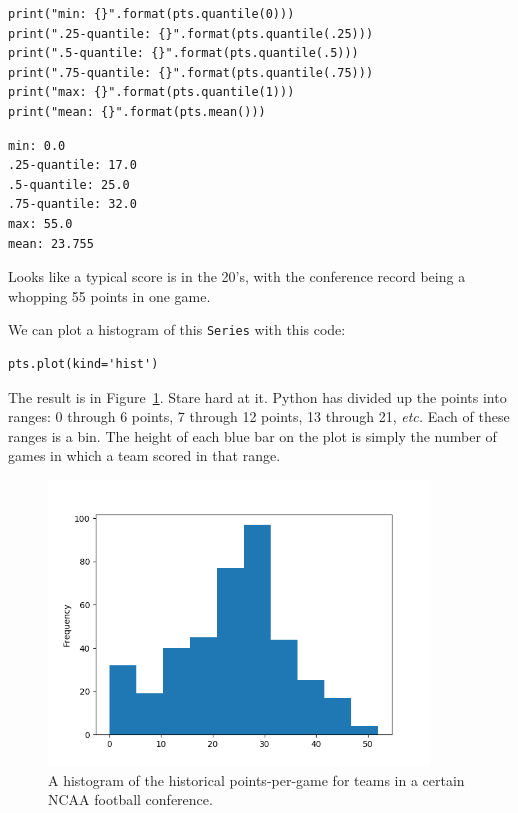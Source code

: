 \begin{Verbatim}[fontsize=\small,samepage=true,frame=single,framesep=3mm]
print("min: {}".format(pts.quantile(0)))
print(".25-quantile: {}".format(pts.quantile(.25)))
print(".5-quantile: {}".format(pts.quantile(.5)))
print(".75-quantile: {}".format(pts.quantile(.75)))
print("max: {}".format(pts.quantile(1)))
print("mean: {}".format(pts.mean()))
\end{Verbatim}
\vspace{-.2in}

\begin{Verbatim}[fontsize=\small,samepage=true,frame=leftline,framesep=5mm,framerule=1mm]
min: 0.0
.25-quantile: 17.0
.5-quantile: 25.0
.75-quantile: 32.0
max: 55.0
mean: 23.755
\end{Verbatim}

Looks like a typical score is in the 20's, with the conference record being a
whopping 55 points in one game.

We can plot a histogram of this \texttt{Series} with this code:

\begin{Verbatim}[fontsize=\small,samepage=true,frame=single,framesep=3mm]
pts.plot(kind='hist')
\end{Verbatim}

The result is in Figure~\ref{fig:ncaa1}. Stare hard at it. Python has divided
up the points into ranges: 0 through 6 points, 7 through 12 points, 13 through
21, \textit{etc.} Each of these ranges is a bin. The height of each blue bar on
the plot is simply the number of games in which a team scored in that range.

\begin{figure}[ht]
\centering
\includegraphics[width=0.9\textwidth]{ncaa1.png}
\caption{A histogram of the historical points-per-game for teams in a certain
NCAA football conference.}
\label{fig:ncaa1}
\end{figure}

